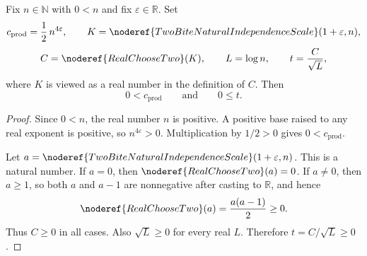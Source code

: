 \begin{helper}
Fix \(n\in\mathbb N\) with \(0<n\) and fix \(\varepsilon\in\mathbb R\).  Set
\[
c_{\mathrm{prod}}=\frac12\,n^{4\varepsilon},\qquad
K=\noderef{TwoBiteNaturalIndependenceScale}(1+\varepsilon,n),
\]
\[
C=\noderef{RealChooseTwo}(K),\qquad
L=\log n,\qquad
t=\frac{C}{\sqrt L},
\]
where \(K\) is viewed as a real number in the definition of \(C\).  Then
\[
0<c_{\mathrm{prod}}\qquad\text{and}\qquad 0\le t.
\]
\end{helper}
\begin{proof}
Since \(0<n\), the real number \(n\) is positive.  A positive base raised to
any real exponent is positive, so \(n^{4\varepsilon}>0\).  Multiplication by
\(1/2>0\) gives \(0<c_{\mathrm{prod}}\).

Let \(a=\noderef{TwoBiteNaturalIndependenceScale}(1+\varepsilon,n)\).  This is
a natural number.  If \(a=0\), then
\(\noderef{RealChooseTwo}(a)=0\).  If \(a\ne0\), then \(a\ge1\), so both
\(a\) and \(a-1\) are nonnegative after casting to \(\mathbb R\), and hence
\[
\noderef{RealChooseTwo}(a)=\frac{a(a-1)}2\ge0.
\]
Thus \(C\ge0\) in all cases.  Also \(\sqrt L\ge0\) for every real \(L\).
Therefore \(t=C/\sqrt L\ge0\).
\end{proof}
